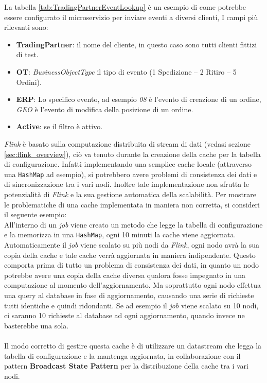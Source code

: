 La tabella \ref{tab:TradingPartnerEventLookup} è un esempio di come potrebbe essere configurato il microservizio per inviare eventi a diversi clienti, I campi più rilevanti sono:
\begin{itemize}
    \item \textbf{TradingPartner}: il nome del cliente, in questo caso sono tutti clienti fittizi di test.
    \item \textbf{OT}: \textit{BusinessObjectType} il tipo di evento (1 Spedizione – 2 Ritiro – 5 Ordini).
    \item \textbf{ERP}: Lo specifico evento, ad esempio \textit{08} è l'evento di creazione di un ordine, \textit{GEO} è l'evento di modifica della posizione di un ordine.
    \item \textbf{Active}: se il filtro è attivo.
\end{itemize}

\textit{Flink} è basato sulla computazione distribuita di stream di dati (vedasi sezione \ref{sec:flink_overview}),
ciò va tenuto durante la creazione della cache per la tabella di configurazione. 
Infatti implementando una semplice cache locale (attraverso una \texttt{HashMap} ad esempio), si potrebbero avere problemi di consistenza dei dati e di sincronizzazione tra i vari nodi.
Inoltre tale implementazione non sfrutta le potenzialità di \textit{Flink} e la sua gestione automatica della scalabilità.
Per mostrare le problematiche di una cache implementata in maniera non corretta, si consideri il seguente esempio:\\
All'interno di un \textit{job}  viene creato un metodo che legge la tabella di configurazione e la memorizza in una \texttt{HashMap}, ogni 10 minuti la cache viene aggiornata.
Automaticamente il \textit{job} viene scalato su più nodi da \textit{Flink}, ogni nodo avrà la sua copia della cache e tale cache verrà aggiornata in maniera indipendente.
Questo comporta prima di tutto un problema di consistenza dei dati, in quanto un nodo potrebbe avere una copia della cache diversa 
qualora fosse impegnato in una computazione al momento dell'aggiornamento.
Ma soprattutto ogni nodo effettua una query al database in fase di aggiornamento, causando una serie di richieste tutti identiche e quindi ridondanti.
Se ad esempio il \textit{job} viene scalato su 10 nodi, ci saranno 10 richieste al database ad ogni aggiornamento, quando invece ne basterebbe una sola.\\\\
Il modo corretto di gestire questa cache è di utilizzare un datastream che legga la tabella di configurazione e la mantenga aggiornata, in collaborazione con il pattern 
\textbf{Broadcast State Pattern} per la distribuzione della cache tra i vari nodi.

